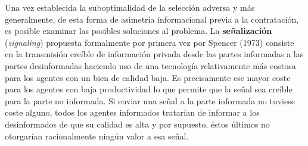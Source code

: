 \documentclass{nuevotema}
\begin{document}
Una vez establecida la suboptimalidad de la selección adversa y más generalmente, de esta forma de asimetría informacional previa a la contratación, es posible examinar las posibles soluciones al problema. La \textbf{señalización} (\textit{signaling}) propuesta formalmente por primera vez por Spencer (1973) consiste en la transmisión creíble de información privada desde las partes informadas a las partes desinformadas haciendo uso de una tecnología relativamente más costosa para los agentes con un bien de calidad baja. Es precisamente ese mayor coste para los agentes con baja productividad lo que permite que la señal sea creíble para la parte no informada. Si enviar una señal a la parte informada no tuviese coste alguno, todos los agentes informados tratarían de informar a los desinformados de que su calidad es alta y por supuesto, éstos últimos no otorgarían racionalmente ningún valor a esa señal. 
 
\end{document}

